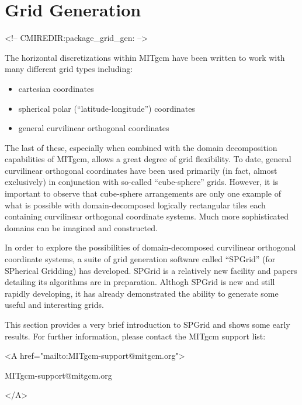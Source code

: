 
\section{Grid Generation}
\label{sec:pkg:grid_gen}
\begin{rawhtml}
<!-- CMIREDIR:package_grid_gen: -->
\end{rawhtml}


The horizontal discretizations within MITgcm have been written to work
with many different grid types including:
\begin{itemize}
\item cartesian coordinates
\item spherical polar (``latitude-longitude'') coordinates
\item general curvilinear orthogonal coordinates
\end{itemize}
The last of these, especially when combined with the domain
decomposition capabilities of MITgcm, allows a great degree of grid
flexibility.  To date, general curvilinear orthogonal coordinates have
been used primarily (in fact, almost exclusively) in conjunction with
so-called ``cube-sphere'' grids.  However, it is important to observe
that cube-sphere arrangements are only one example of what is possible
with domain-decomposed logically rectangular tiles each containing
curvilinear orthogonal coordinate systems.  Much more sophisticated 
domains can be imagined and constructed.

In order to explore the possibilities of domain-decomposed curvilinear
orthogonal coordinate systems, a suite of grid generation software
called ``SPGrid'' (for SPherical Gridding) has developed.  SPGrid is a
relatively new facility and papers detailing its algorithms are in
preparation.  Althogh SPGrid is new and still rapidly developing, it
has already demonstrated the ability to generate some useful and
interesting grids.

This section provides a very brief introduction to SPGrid and shows
some early results.  For further information, please contact the
MITgcm support list:
\begin{center}
  \begin{rawhtml} <A href="mailto:MITgcm-support@mitgcm.org"> \end{rawhtml}
  MITgcm-support@mitgcm.org
  \begin{rawhtml} </A> \end{rawhtml}
\end{center}


